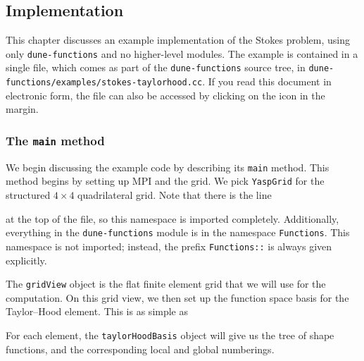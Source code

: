 \documentclass[a4paper,10pt,headings=normal,bibliography=totoc]{scrartcl}
\newcommand{\cpp}[1]{\lstinline[basicstyle=\ttfamily]!#1!}
\newcommand{\dunemodule}[1]{\texttt{#1}}
\newcommand{\file}[1]{\texttt{#1}}
\begin{document}
\subsection{Implementation}

This chapter discusses an example implementation of the Stokes problem, using only \dunemodule{dune-functions}
and no higher-level modules.  The example is contained in a single file, which comes as part of the \dunemodule{dune-functions}
source tree, in \file{dune-functions/examples/stokes-taylorhood.cc}.  If you read this document in electronic form,
the file can also be accessed by clicking on the icon in the margin.%
%

\subsubsection{The \texorpdfstring{\cpp{main}}{main} method}

We begin discussing the example code by describing its \cpp{main} method.  This method begins by setting up MPI and the grid.
We pick \cpp{YaspGrid} for the structured $4 \times 4$ quadrilateral grid.  Note that there is the line
%

%
at the top of the file, so this namespace is imported completely.  Additionally, everything in the \dunemodule{dune-functions}
module is in the namespace \cpp{Functions}.  This namespace is not imported; instead, the prefix \cpp{Functions::} is always
given explicitly.


%

%
The \cpp{gridView} object is the flat finite element grid that we will use for
the computation.
On this grid view, we then set up the function space basis for the Taylor--Hood element.  This is as simple as
%

%
For each element, the \cpp{taylorHoodBasis} object will give us the tree of shape functions, and the corresponding local and global numberings.
\end{document}
